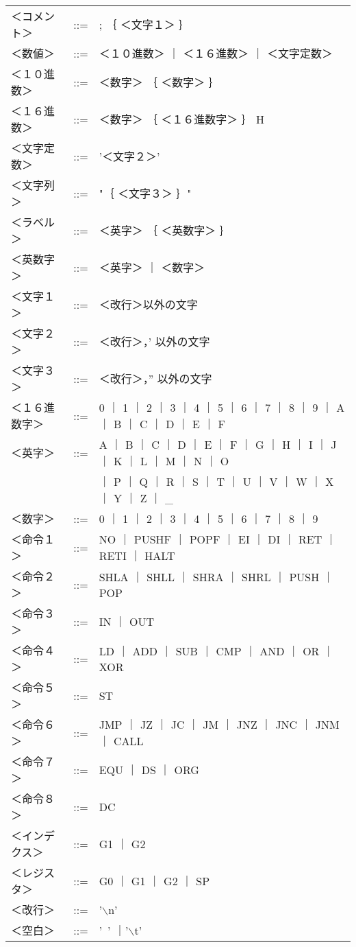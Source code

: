 \begin{center}
{\begin{tabular}{lll}
＜コメント＞  & ::= &; ｛ ＜文字１＞ ｝ \\
＜数値＞      & ::= &＜１０進数＞ ｜ ＜１６進数＞ ｜ ＜文字定数＞ \\
＜１０進数＞  & ::= &＜数字＞ ｛ ＜数字＞ ｝ \\
＜１６進数＞  & ::= &＜数字＞ ｛ ＜１６進数字＞ ｝ H \\
＜文字定数＞  & ::= &'＜文字２＞' \\
＜文字列＞    & ::= &"｛ ＜文字３＞ ｝" \\
＜ラベル＞    & ::= &＜英字＞ ｛ ＜英数字＞ ｝ \\
＜英数字＞    & ::= &＜英字＞ ｜ ＜数字＞ \\
＜文字１＞    & ::= &＜改行＞以外の文字 \\
＜文字２＞    & ::= &＜改行＞，' 以外の文字 \\
＜文字３＞    & ::= &＜改行＞，” 以外の文字 \\
＜１６進数字＞& ::= &0 ｜ 1 ｜ 2 ｜ 3 ｜ 4 ｜ 5 ｜ 6 ｜ 7 ｜ 8 ｜ 9 
                       ｜ A ｜ B ｜ C ｜ D ｜ E ｜ F \\
＜英字＞      & ::= &A ｜ B ｜ C ｜ D ｜ E ｜ F ｜ G ｜ H ｜ I ｜ J 
                       ｜ K ｜ L ｜ M ｜ N ｜ O \\
              &     &  ｜ P ｜ Q ｜ R ｜ S ｜ T ｜ U ｜ V ｜ W ｜ X
                       ｜ Y ｜ Z ｜ \_ \\
＜数字＞      & ::= &0 ｜ 1 ｜ 2 ｜ 3 ｜ 4 ｜ 5 ｜ 6 ｜ 7 ｜ 8 ｜ 9 \\
＜命令１＞    & ::= &NO ｜ PUSHF ｜ POPF ｜ EI ｜ DI ｜ RET ｜RETI ｜ HALT \\
＜命令２＞    & ::= &SHLA ｜ SHLL ｜ SHRA ｜ SHRL ｜ PUSH ｜ POP \\
＜命令３＞    & ::= &IN ｜ OUT \\
＜命令４＞    & ::= &LD ｜ ADD ｜ SUB ｜ CMP ｜ AND ｜ OR ｜XOR \\
＜命令５＞    & ::= &ST \\
＜命令６＞    & ::= &JMP ｜ JZ ｜ JC ｜ JM ｜ JNZ ｜ JNC ｜ JNM ｜ CALL \\
＜命令７＞    & ::= &EQU ｜ DS ｜ ORG \\
＜命令８＞    & ::= &DC \\
＜インデクス＞& ::= &G1 ｜ G2 \\
＜レジスタ＞  & ::= &G0 ｜ G1 ｜ G2 ｜ SP \\
＜改行＞      & ::= &'$\backslash$n' \\
＜空白＞      & ::= &'~' ｜'$\backslash$t' \\
\end{tabular}}
\end{center}

